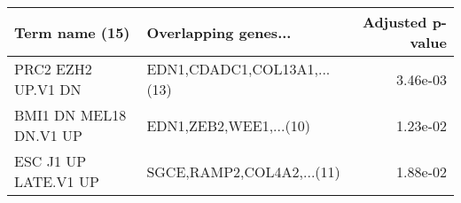 \begin{tabular}{llr}
\toprule
        Term name (15) &        Overlapping genes... &  Adjusted p-value \\
\midrule
    PRC2 EZH2 UP.V1 DN & EDN1,CDADC1,COL13A1,...(13) &          3.46e-03 \\
BMI1 DN MEL18 DN.V1 UP &      EDN1,ZEB2,WEE1,...(10) &          1.23e-02 \\
  ESC J1 UP LATE.V1 UP &   SGCE,RAMP2,COL4A2,...(11) &          1.88e-02 \\
\bottomrule
\end{tabular}
